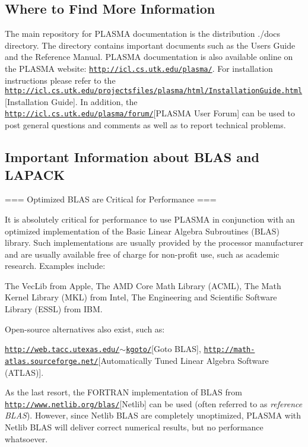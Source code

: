 \subsection*{Where to Find More Information }

The main repository for P\+L\+A\+S\+M\+A documentation is the distribution ./docs directory. The directory contains important documents such as the Users\textquotesingle{} Guide and the Reference Manual. P\+L\+A\+S\+M\+A documentation is also available online on the P\+L\+A\+S\+M\+A website\+: \href{http://icl.cs.utk.edu/plasma/}{\tt http\+://icl.\+cs.\+utk.\+edu/plasma/}. For installation instructions please refer to the \href{http://icl.cs.utk.edu/projectsfiles/plasma/html/InstallationGuide.html}{\tt http\+://icl.\+cs.\+utk.\+edu/projectsfiles/plasma/html/\+Installation\+Guide.\+html}\mbox{[}Installation Guide\mbox{]}. In addition, the \href{http://icl.cs.utk.edu/plasma/forum/}{\tt http\+://icl.\+cs.\+utk.\+edu/plasma/forum/}\mbox{[}P\+L\+A\+S\+M\+A User Forum\mbox{]} can be used to post general questions and comments as well as to report technical problems.

\subsection*{Important Information about B\+L\+A\+S and L\+A\+P\+A\+C\+K }

=== Optimized B\+L\+A\+S are Critical for Performance ===

It is absolutely critical for performance to use P\+L\+A\+S\+M\+A in conjunction with an optimized implementation of the Basic Linear Algebra Subroutines (B\+L\+A\+S) library. Such implementations are usually provided by the processor manufacturer and are usually available free of charge for non-\/profit use, such as academic research. Examples include\+:

The Vec\+Lib from Apple, The A\+M\+D Core Math Library (A\+C\+M\+L), The Math Kernel Library (M\+K\+L) from Intel, The Engineering and Scientific Software Library (E\+S\+S\+L) from I\+B\+M.

Open-\/source alternatives also exist, such as\+:

\href{http://web.tacc.utexas.edu/~kgoto/}{\tt http\+://web.\+tacc.\+utexas.\+edu/$\sim$kgoto/}\mbox{[}Goto B\+L\+A\+S\mbox{]}, \href{http://math-atlas.sourceforge.net/}{\tt http\+://math-\/atlas.\+sourceforge.\+net/}\mbox{[}Automatically Tuned Linear Algebra Software (A\+T\+L\+A\+S)\mbox{]}.

As the last resort, the F\+O\+R\+T\+R\+A\+N implementation of B\+L\+A\+S from \href{http://www.netlib.org/blas/}{\tt http\+://www.\+netlib.\+org/blas/}\mbox{[}Netlib\mbox{]} can be used (often referred to as {\itshape reference B\+L\+A\+S}). However, since Netlib B\+L\+A\+S are completely unoptimized, P\+L\+A\+S\+M\+A with Netlib B\+L\+A\+S will deliver correct numerical results, but no performance whatsoever.

